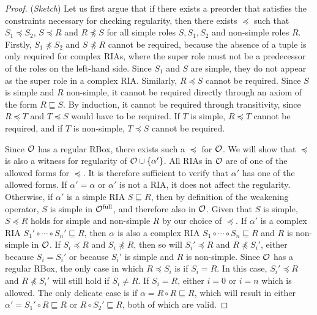 \begin{proof}(\emph{Sketch}) \label{proof:regularity}
  Let us first argue that if there exists a preorder that satisfies the constraints necessary for checking regularity, then there exists $\preceq$ such that $S_1 \preceq S_2$, $S \preceq R$ and $R \not\preceq S$ for all simple roles $S, S_1, S_2$ and non-simple roles $R$. Firstly, $S_1 \not\preceq S_2$ and $S \not\preceq R$ cannot be required, because the absence of a tuple is only required for complex RIAs, where the super role must not be a predecessor of the roles on the left-hand side. Since $S_1$ and $S$ are simple, they do not appear as the super role in a complex RIA. Similarly, $R \preceq S$ cannot be required. Since $S$ is simple and $R$ non-simple, it cannot be required directly through an axiom of the form $R \sqsubseteq S$. By induction, it cannot be required through transitivity, since $R \preceq T$ and $T \preceq S$ would have to be required. If $T$ is simple, $R \preceq T$ cannot be required, and if $T$ is non-simple, $T \preceq S$ cannot be required.

  Since $\mathcal{O}$ has a regular RBox, there exists such a $\preceq$ for $\mathcal{O}$. We will show that $\preceq$ is also a witness for regularity of $\mathcal{O} \cup \{ \alpha' \}$. All RIAs in $\mathcal{O}$ are of one of the allowed forms for $\preceq$. It is therefore sufficient to verify that $\alpha'$ has one of the allowed forms.
  If $\alpha' = \alpha$ or $\alpha'$ is not a RIA, it does not affect the regularity.
  Otherwise, if $\alpha'$ is a simple RIA $S \sqsubseteq R$, then by definition of the weakening operator, $S$ is simple in ${\mathcal{O}^\textnormal{full}}$, and therefore also in $\mathcal{O}$. Given that $S$ is simple, $S \preceq R$ holds for simple and non-simple $R$ by our choice of $\preceq$.
  If $\alpha'$ is a complex RIA $S_1' \circ \cdots \circ S_n' \sqsubseteq R$, then $\alpha$ is also a complex RIA $S_1 \circ \cdots \circ S_n \sqsubseteq R$ and $R$ is non-simple in $\mathcal{O}$. If $S_i \preceq R$ and $S_i \not\preceq R$, then so will $S_i' \preceq R$ and $R \not\preceq S_i'$, either because $S_i = S_i'$ or because $S_i'$ is simple and $R$ is non-simple. Since $\mathcal{O}$ has a regular RBox, the only case in which $R \preceq S_i$ is if $S_i = R$. In this case, $S_i' \preceq R$ and $R \not\preceq S_i'$ will still hold if $S_i \not= R$. If $S_i = R$, either $i = 0$ or $i = n$ which is allowed. The only delicate case is if $\alpha = R \circ R \sqsubseteq R$, which will result in either $\alpha' = S_1' \circ R \sqsubseteq R$ or $R \circ S_2' \sqsubseteq R$, both of which are valid.
\end{proof}

